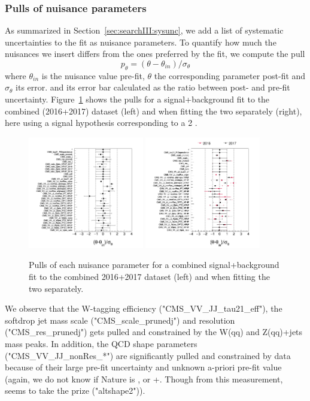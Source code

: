 \subsubsection{Pulls of nuisance parameters}
\label{sec:searchIII:pulls}
As summarized in Section~\ref{sec:searchIII:sysunc}, we add a list of systematic uncertainties to the fit as nuisance parameters.
To quantify how much the nuisances we insert differs from the ones preferred by the fit, we compute the pull
\begin{equation}
p_{\theta} = (\theta - \theta_{in})/\sigma_\theta
\end{equation}
where $\theta_{in}$ is the nuisance value pre-fit, $\theta$ the corresponding parameter post-fit and $\sigma_\theta$ its error.
and its error bar calculated as the ratio between post- and pre-fit uncertainty.
Figure~\ref{fig:searchIII:pullsCombo1617} shows the pulls for a signal+background fit to the combined (2016+2017) dataset (left) and when fitting the two separately (right), here using a signal hypothesis corresponding to a 2 \TeV \BulkG.
\begin{figure}[h!]
\centering
\includegraphics[width=0.45\textwidth]{figures/analysis/search3/AN-17-303/postfitchecks/pulls_Combo1617.png}
\includegraphics[width=0.45\textwidth]{figures/analysis/search3/AN-17-303/postfitchecks/pulls_16_vs_17.png}
\caption{Pulls of each nuisance parameter for a combined signal+background fit to the combined 2016+2017 dataset (left) and when fitting the two separately.}
\label{fig:searchIII:pullsCombo1617}
\end{figure}
We observe that the W-tagging efficiency ("CMS\_VV\_JJ\_tau21\_eff"), the softdrop jet mass scale ("CMS\_scale\_prunedj") and resolution ("CMS\_res\_prunedj") gets pulled and constrained by the W(qq) and Z(qq)+jets mass peaks. In addition, the QCD shape parameters ("CMS\_VV\_JJ\_nonRes\_*") are significantly pulled and constrained by data because of their large pre-fit uncertainty and unknown a-priori pre-fit value (again, we do not know if Nature is , \HERWIG{++} or \MADGRAPH{}+. Though from this measurement, \HERWIG{++} seems to take the prize ("altshape2")).

